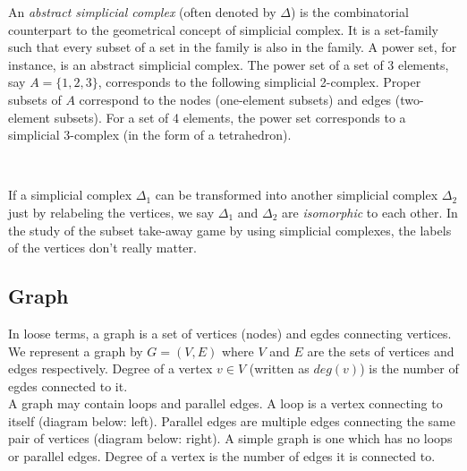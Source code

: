 \documentclass[a4paper, 12pt]{article}
\theoremstyle{remark} %
\begin{document}
An \textit{abstract simplicial complex}  (often denoted by $\Delta$) is the combinatorial counterpart to the geometrical concept of simplicial complex. It is a set-family such that every subset of a set in the family is also in the family. A power set, for instance, is an abstract simplicial complex. The power set of a set of 3 elements, say $A=\{1,2,3\}$, corresponds to the following simplicial 2-complex. Proper subsets of $A$ correspond to the nodes (one-element subsets) and edges (two-element subsets). For a set of 4 elements, the power set corresponds to a simplicial 3-complex (in the form of a tetrahedron).\\

\begin{center}
\\
\end{center}

If a simplicial complex $\Delta_1$ can be transformed into another simplicial complex $\Delta_2$ just by relabeling the vertices, we say $\Delta_1$ and $\Delta_2$ are \textit{isomorphic} to each other. In the study of the subset take-away game by using simplicial complexes, the labels of the vertices don't really matter.\\

\subsection{Graph}

In loose terms, a graph is a set of vertices (nodes) and egdes connecting vertices. We represent a graph by $G = (V,E)$ where $V$ and $E$ are the sets of vertices and edges respectively. Degree  of a vertex $v \in V$ (written as $deg(v)$) is the number of egdes connected to it.\\

A graph may contain loops and parallel edges. A loop  is a vertex connecting to itself (diagram below: left). Parallel edges  are multiple edges connecting the same pair of vertices (diagram below: right). A simple graph is one which has no loops or parallel edges. Degree of a vertex is the number of edges it is connected to.\\
\end{document}
